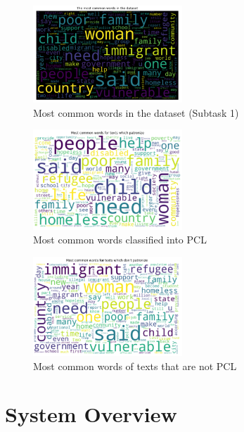 \documentclass[11pt]{article}
\begin{document}
\begin{figure}[h]
\centering
\includegraphics[width=0.5\textwidth]{common.png}
\caption{Most common words in the dataset (Subtask 1)}
\label{fig2}
\end{figure}

\begin{figure}[h]
\centering
\includegraphics[width=0.5\textwidth]{pcl.png}
\caption{Most common words classified into PCL}
\label{fig3}
\end{figure}

\begin{figure}[h]
\centering
\includegraphics[width=0.5\textwidth]{nopcl.png}
\caption{Most common words of texts that are not PCL}
\label{fig4}
\end{figure}

\section{System Overview}
\end{document}

